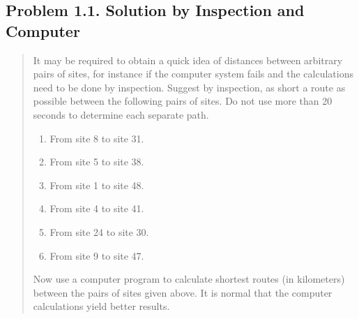 \subsection{Problem 1.1. Solution by Inspection and Computer}
\begin{quote}
It may be required to obtain a quick idea of distances between arbitrary pairs of sites, for instance if the computer system fails and the calculations need to be done by inspection. Suggest by inspection, as short a route as possible between the following pairs of sites. Do not use more than 20 seconds to determine each separate path.
\begin{enumerate}[(1)]
\item From site 8 to site 31.
\item From site 5 to site 38.
\item From site 1 to site 48.
\item From site 4 to site 41.
\item From site 24 to site 30.
\item From site 9 to site 47.
\end{enumerate}

Now use a computer program to calculate shortest routes (in kilometers) between the pairs of sites given above. It is normal that the computer calculations yield better results.
\end{quote}

